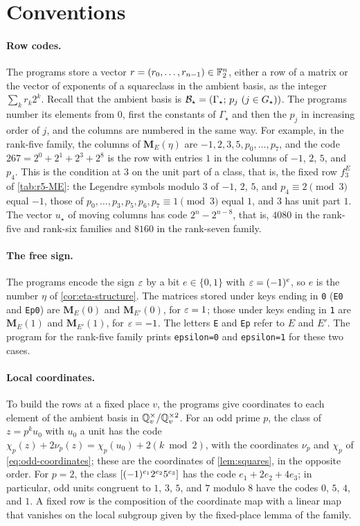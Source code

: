 \section{Conventions}\label{sec:verification-conventions}

\paragraph{Row codes.} The programs store a vector $r=(r_0,\dots,r_{n-1})\in\mathbb F_2^n$, either a row of a matrix or the vector of exponents of a squareclass in the ambient basis, as the integer $\sum_kr_k2^k$. Recall that the ambient basis is $\mathcal B_\star=(\Gamma_\star;\,p_j\ (j\in G_\star))$. The programs number its elements from $0$, first the constants of $\Gamma_\star$ and then the $p_j$ in increasing order of $j$, and the columns are numbered in the same way. For example, in the rank-five family, the columns of $\mathbf M_E(\eta)$ are $-1,2,3,5,p_0,\dots,p_7$, and the code $267=2^0+2^1+2^3+2^8$ is the row with entries $1$ in the columns of $-1$, $2$, $5$, and $p_4$. This is the condition at $3$ on the unit part of a class, that is, the fixed row $f^E_3$ of \cref{tab:r5-ME}: the Legendre symbols modulo $3$ of $-1$, $2$, $5$, and $p_4\equiv2\pmod 3$ equal $-1$, those of $p_0,\dots,p_3,p_5,p_6,p_7\equiv1\pmod3$ equal $1$, and $3$ has unit part $1$. The vector $u_\star$ of moving columns has code $2^n-2^{n-8}$, that is, $4080$ in the rank-five and rank-six families and $8160$ in the rank-seven family.

\paragraph{The free sign.} The programs encode the sign $\varepsilon$ by a bit $e\in\{0,1\}$ with $\varepsilon=(-1)^e$, so $e$ is the number $\eta$ of \cref{cor:eta-structure}. The matrices stored under keys ending in \texttt{0} (\texttt{E0} and \texttt{Ep0}) are $\mathbf M_E(0)$ and $\mathbf M_{E'}(0)$, for $\varepsilon=1$; those under keys ending in \texttt{1} are $\mathbf M_E(1)$ and $\mathbf M_{E'}(1)$, for $\varepsilon=-1$. The letters \texttt{E} and \texttt{Ep} refer to $E$ and $E'$. The program for the rank-five family prints \texttt{epsilon=0} and \texttt{epsilon=1} for these two cases.

\paragraph{Local coordinates.} To build the rows at a fixed place $v$, the programs give coordinates to each element of the ambient basis in $\mathbb Q_v^{\times}/\mathbb Q_v^{\times2}$. For an odd prime $p$, the class of $z=p^ku_0$ with $u_0$ a unit has the code $\chi_p(z)+2\nu_p(z)=\chi_p(u_0)+2(k\bmod2)$, with the coordinates $\nu_p$ and $\chi_p$ of \eqref{eq:odd-coordinates}; these are the coordinates of \cref{lem:squares}, in the opposite order. For $p=2$, the class $[(-1)^{e_1}2^{e_2}5^{e_3}]$ has the code $e_1+2e_2+4e_3$; in particular, odd units congruent to $1$, $3$, $5$, and $7$ modulo $8$ have the codes $0$, $5$, $4$, and $1$. A fixed row is the composition of the coordinate map with a linear map that vanishes on the local subgroup given by the fixed-place lemma of the family.

